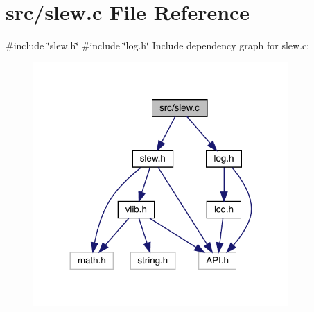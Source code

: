 \section{src/slew.c File Reference}
\label{slew_8c}
{\ttfamily \#include \char`\"{}slew.\+h\char`\"{}}\newline
{\ttfamily \#include \char`\"{}log.\+h\char`\"{}}\newline
Include dependency graph for slew.\+c\+:
\nopagebreak
\begin{figure}[H]
\begin{center}
\leavevmode
\includegraphics[width=276pt]{slew_8c__incl}
\end{center}
\end{figure}
